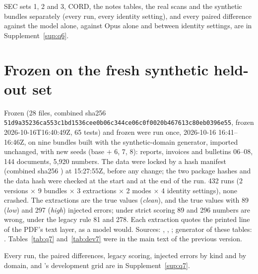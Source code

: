 




SEC sets 1, 2 and 3, CORD, the notes tables, the real scans and the synthetic bundles separately (every run, every identity setting), and every paired difference against the model alone, against Opus alone and between identity settings, are in Supplement~\ref{sup:q6}.

\section{Frozen  on the fresh synthetic held-out set}\label{app:q7}
Frozen  (28 files, combined sha256 {\small\nolinkurl{51d9a35236ca553c1bd1536cee0b06c344ce06c0f0020b467613c80eb0396e55}}, frozen 2026-10-16T16:40:49Z, 65 tests) and frozen  were run once, 2026-10-16 16:41--16:46Z, on nine bundles built with the synthetic-domain generator, imported unchanged, with new seeds (base $+$ 6, 7, 8): reports, invoices and bulletins 06--08, 144 documents, 5,920 numbers. The data were locked by a hash manifest (combined sha256 ) at 15:27:55Z, before any  change; the two package hashes and the data hash were checked at the start and at the end of the run. 432 runs (2 versions $\times$ 9 bundles $\times$ 3 extractions $\times$ 2 modes $\times$ 4 identity settings), none crashed. The extractions are the true values (\emph{clean}), and the true values with 89 (\emph{low}) and 297 (\emph{high}) injected errors; under strict scoring 89 and 296 numbers are wrong, under the legacy rule 81 and 278. Each extraction quotes the printed line of the PDF's text layer, as a model would. Sources: , , ; generator of these tables: . Tables~\ref{tab:q7} and~\ref{tab:dev7} were in the main text of the previous version.




Every run, the paired differences, legacy scoring, injected errors by kind and by domain, and 's development grid are in Supplement~\ref{sup:q7}.

